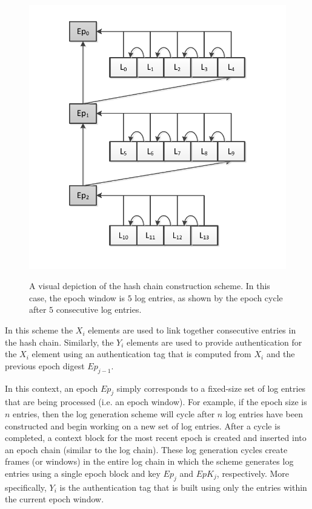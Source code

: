 \documentclass{sig-alternate}
\begin{document}
\begin{figure}[ht!]
  \centering
  \includegraphics[scale=0.8]{images/hashchain.pdf} \\
\caption{A visual depiction of the hash chain construction scheme. In this case, the epoch window is $5$ log entries, as shown by the epoch
cycle after $5$ consecutive log entries.}
\label{fig:hashChain}
\end{figure}

In this scheme the $X_i$ elements are used to link together consecutive entries in 
the hash chain. Similarly, the $Y_i$ elements are used to provide authentication 
for the $X_i$ element using an authentication tag that is computed from $X_i$ and the 
previous epoch digest $Ep_{j - 1}$. 

In this context, an epoch $Ep_j$ simply corresponds to a fixed-size set of log entries that
are being processed (i.e. an epoch window). For example, if the epoch size is $n$ entries, then the 
log generation scheme will cycle after $n$ log entries have been constructed and begin working on a new set of log entries. After a cycle is completed, a context block
for the most recent epoch is created and inserted into an epoch chain (similar to the log chain). These log generation cycles create frames (or windows) in the entire log chain in which the 
scheme generates log entries using a single epoch block and key $Ep_{j}$ and $EpK_j$, respectively. 
More specifically, $Y_i$ is the authentication tag that is built using only the entries within the current epoch window.
\end{document}
